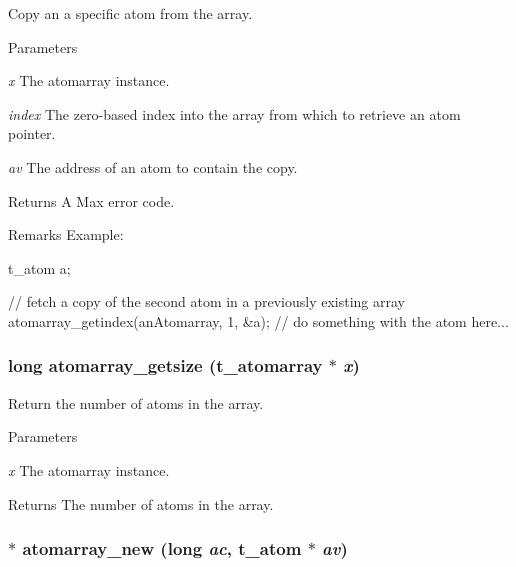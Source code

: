 Copy an a specific atom from the array. 
\begin{DoxyParams}{Parameters}
\item[{\em x}]The atomarray instance. \item[{\em index}]The zero-\/based index into the array from which to retrieve an atom pointer. \item[{\em av}]The address of an atom to contain the copy. \end{DoxyParams}
\begin{DoxyReturn}{Returns}
A Max error code.
\end{DoxyReturn}
\begin{DoxyRemark}{Remarks}
Example: 
\begin{DoxyCode}
    {
        t_atom a;

        // fetch a copy of the second atom in a previously existing array
        atomarray_getindex(anAtomarray, 1, &a);
        // do something with the atom here...
    }
\end{DoxyCode}
 
\end{DoxyRemark}
\hypertarget{group__atomarray_gaef611e510133de82b09496f9ff59662f}{
\subsubsection[{atomarray\_\-getsize}]{\setlength{\rightskip}{0pt plus 5cm}long atomarray\_\-getsize ({\bf t\_\-atomarray} $\ast$ {\em x})}}
\label{group__atomarray_gaef611e510133de82b09496f9ff59662f}


Return the number of atoms in the array. 
\begin{DoxyParams}{Parameters}
\item[{\em x}]The atomarray instance. \end{DoxyParams}
\begin{DoxyReturn}{Returns}
The number of atoms in the array. 
\end{DoxyReturn}
\hypertarget{group__atomarray_ga2896b4949e03841f4c5a71ad7f7fadf7}{
\subsubsection[{atomarray\_\-new}]{$\ast$ atomarray\_\-new (long {\em ac}, \/  {\bf t\_\-atom} $\ast$ {\em av})}}
\label{group__atomarray_ga2896b4949e03841f4c5a71ad7f7fadf7}


